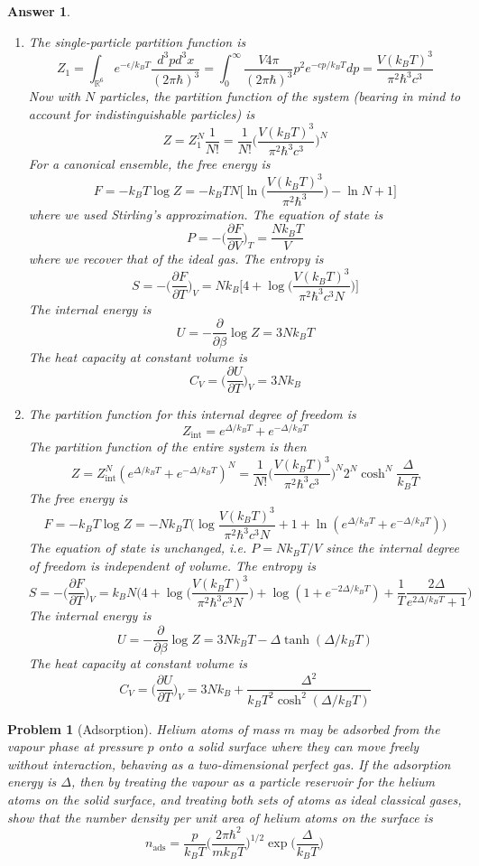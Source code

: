 \documentclass[a4paper]{article}
\theoremstyle{new2}
\newtheorem{ans}{Answer}[section]
\theoremstyle{new}
\newtheorem{qns}{Problem}[section]
\begin{document}
\begin{ans}\leavevmode
\begin{enumerate}[label=(\alph*)]
\item The single-particle partition function is
$$Z_1=\int_{\mathbb{R}^6} e^{-\epsilon/k_BT}\frac{d^3pd^3x}{(2\pi\hbar)^3}=\int_0^\infty\frac{V4\pi}{(2\pi\hbar)^3}p^2e^{-cp/k_BT}dp=\frac{V(k_BT)^3}{\pi^2\hbar^3c^3}$$
Now with $N$ particles, the partition function of the system (bearing in mind to account for indistinguishable particles) is
$$Z=Z_1^N\frac{1}{N!}=\frac{1}{N!}\bigg(\frac{V(k_BT)^3}{\pi^2\hbar^3c^3}\bigg)^N$$
For a canonical ensemble, the free energy is
$$F=-k_BT\log Z=-k_BTN\bigg[\ln\bigg(\frac{V(k_BT)^3}{\pi^2\hbar^3}\bigg)-\ln N+1\bigg]$$
where we used Stirling's approximation. The equation of state is
$$P=-\bigg(\frac{\partial F}{\partial V}\bigg)_T=\frac{Nk_BT}{V}$$
where we recover that of the ideal gas. The entropy is
$$S=-\bigg(\frac{\partial F}{\partial T}\bigg)_V=Nk_B\bigg[4+\log\bigg(\frac{V(k_BT)^3}{\pi^2\hbar^3c^3N}\bigg)\bigg]$$
The internal energy is
$$U=-\frac{\partial}{\partial\beta}\log Z=3Nk_BT$$
The heat capacity at constant volume is
$$C_V=\bigg(\frac{\partial U}{\partial T}\bigg)_V=3Nk_B$$
\item The partition function for this internal degree of freedom is 
$$Z_{\text{int}}=e^{\Delta/k_BT}+e^{-\Delta/k_BT}$$
The partition function of the entire system is then
$$Z=Z_{\text{int}}^N(e^{\Delta/k_BT}+e^{-\Delta/k_BT})^N=\frac{1}{N!}\bigg(\frac{V(k_BT)^3}{\pi^2\hbar^3c^3}\bigg)^N2^N\cosh^N\frac{\Delta}{k_BT}$$
The free energy is 
$$F=-k_BT\log Z=-Nk_BT\bigg(\log\frac{V(k_BT)^3}{\pi^2\hbar^3c^3N}+1+\ln(e^{\Delta/k_BT}+e^{-\Delta/k_BT})\bigg)$$
The equation of state is unchanged, i.e. $P=Nk_BT/V$ since the internal degree of freedom is independent of volume. The entropy is
$$S=-\bigg(\frac{\partial F}{\partial T}\bigg)_V=k_BN\bigg(4+\log\bigg(\frac{V(k_BT)^3}{\pi^2\hbar^3c^3N}\bigg)+\log(1+e^{-2\Delta/k_BT})+\frac{1}{T}\frac{2\Delta}{e^{2\Delta/k_BT}+1}\bigg)$$
The internal energy is
$$U=-\frac{\partial}{\partial\beta}\log Z=3Nk_BT-\Delta\tanh(\Delta/k_BT)$$
The heat capacity at constant volume is
$$C_V=\bigg(\frac{\partial U}{\partial T}\bigg)_V=3Nk_B+\frac{\Delta^2}{k_BT^2\cosh^2(\Delta/k_BT)}$$
\end{enumerate}
\end{ans}
\begin{qns}[Adsorption]
Helium atoms of mass $m$ may be adsorbed from the vapour phase at pressure $p$ onto a solid surface where they can move freely without interaction, behaving as a two-dimensional perfect gas. If the adsorption energy is $\Delta$, then by treating the vapour as a particle reservoir for the helium atoms on the solid surface, and treating both sets of atoms as ideal classical gases, show that the number density per unit area of helium atoms on the surface is
$$n_{\text{ads}}=\frac{p}{k_BT}\bigg(\frac{2\pi\hbar^2}{mk_BT}\bigg)^{1/2}\exp\bigg(\frac{\Delta}{k_BT}\bigg)$$
\end{qns}
\end{document}
